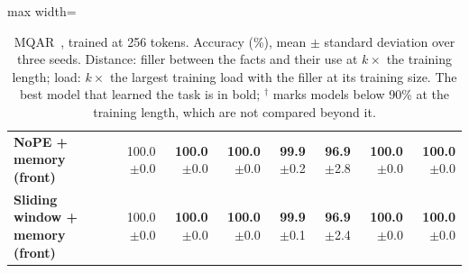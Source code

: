 \begin{table}
\begin{adjustbox}{max width=\linewidth}
\begin{tabular}{lrrrrrrr}
\textbf{NoPE + memory (front)} & 100.0{\scriptsize$\pm$0.0} & \textbf{100.0}{\scriptsize$\pm$0.0} & \textbf{100.0}{\scriptsize$\pm$0.0} & \textbf{99.9}{\scriptsize$\pm$0.2} & \textbf{96.9}{\scriptsize$\pm$2.8} & \textbf{100.0}{\scriptsize$\pm$0.0} & \textbf{100.0}{\scriptsize$\pm$0.0} \\
\textbf{Sliding window + memory (front)} & 100.0{\scriptsize$\pm$0.0} & \textbf{100.0}{\scriptsize$\pm$0.0} & \textbf{100.0}{\scriptsize$\pm$0.0} & \textbf{99.9}{\scriptsize$\pm$0.1} & \textbf{96.9}{\scriptsize$\pm$2.4} & \textbf{100.0}{\scriptsize$\pm$0.0} & \textbf{100.0}{\scriptsize$\pm$0.0} \\
\bottomrule
\end{tabular}
\end{adjustbox}
\caption{MQAR~\citep{arora2024zoology}, trained at 256 tokens. Accuracy (\%), mean $\pm$ standard deviation over three seeds. Distance: filler between the facts and their use at $k\times$ the training length; load: $k\times$ the largest training load with the filler at its training size. The best model that learned the task is in bold; $^\dagger$ marks models below 90\% at the training length, which are not compared beyond it.}
\label{tab:mqar}
\end{table}
